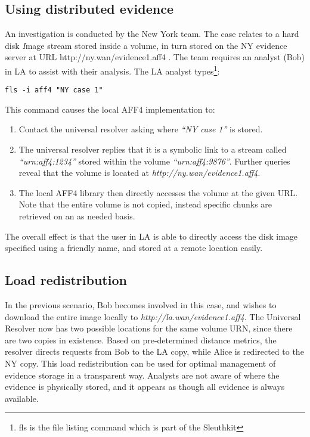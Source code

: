 \documentclass[10pt, conference]{IEEEtran}
\begin{document}
\subsection{Using distributed evidence}
An investigation is conducted by the New York team. The case relates
to a hard disk {\emph Image stream} stored inside a volume, in turn
stored on the NY evidence server at URL http://ny.wan/evidence1.aff4
. The team requires an analyst (Bob) in LA to assist with their
analysis. The LA analyst types\footnote{fls is the file listing
command which is part of the Sleuthkit}:

\begin{lstlisting}
fls -i aff4 "NY case 1"
\end{lstlisting}
This command causes the local AFF4 implementation to:
\begin{enumerate}
\item Contact the universal resolver asking where \emph{``NY case 1''} is
stored.
\item The universal resolver replies that it is a symbolic link to a
stream called \emph{``urn:aff4:1234''} stored within the volume
\emph{``urn:aff4:9876''}. Further queries reveal that the volume is
located at \emph{http://ny.wan/evidence1.aff4}.
\item The local AFF4 library then directly accesses the volume at the
given URL. Note that the entire volume is not copied, instead specific
chunks are retrieved on an as needed basis.
\end{enumerate}

The overall effect is that the user in LA is able to directly access
the disk image specified using a friendly name, and stored at a remote
location easily.

\subsection{Load redistribution}
In the previous scenario, Bob becomes involved in this case, and
wishes to download the entire image locally to
\emph{http://la.wan/evidence1.aff4}. The Universal Resolver now has
two possible locations for the same volume URN, since there are two
copies in existence. Based on pre-determined distance metrics, the
resolver directs requests from Bob to the LA copy, while Alice is
redirected to the NY copy. This load redistribution can be used for
optimal management of evidence storage in a transparent way. Analysts
are not aware of where the evidence is physically stored, and it
appears as though all evidence is always available.
\end{document}

